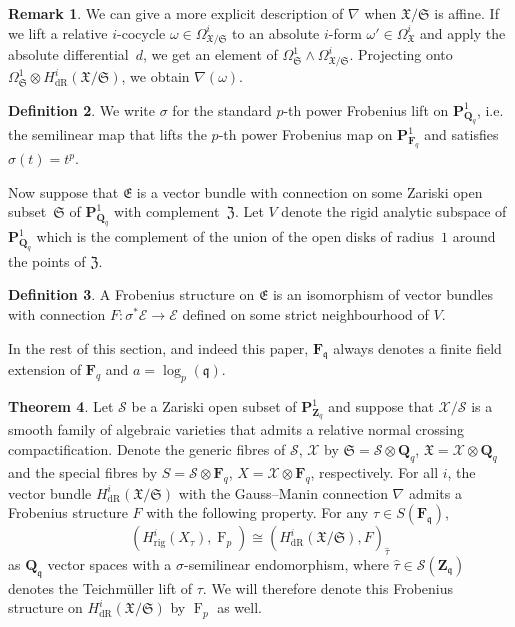 \documentclass[a4paper,11pt]{article}
\numberwithin{equation}{section}
\newcommand{\ZZ}{\mathbf{Z}} %
\newcommand{\QQ}{\mathbf{Q}} %
\newcommand{\FF}{\mathbf{F}} %
\DeclareMathOperator{\Frob}{F}           %
\providecommand{\HdR}{H_{\text{dR}}}    %
\providecommand{\Hrig}{H_{\text{rig}}}  %
\theoremstyle{definition}
\newtheorem{thm}{Theorem}[section]
\newtheorem{defn}[thm]{Definition}
\newtheorem{rem}[thm]{Remark}
\begin{document}
\begin{rem}
We can give a more explicit description of $\nabla$ when 
$\mathfrak{X}/\mathfrak{S}$ is affine. If we lift a relative $i$-cocycle 
$\omega \in \Omega^i_{\mathfrak{X}/\mathfrak{S}}$ to an absolute $i$-form 
$\omega' \in \Omega^i_{\mathfrak{X}}$ and apply the absolute differential~$d$, 
we get an element of 
$\Omega^1_{\mathfrak{S}} \wedge \Omega^i_{\mathfrak{X}/\mathfrak{S}}$. 
Projecting onto 
$\Omega^1_{\mathfrak{S}} \otimes \HdR^i(\mathfrak{X}/\mathfrak{S})$, 
we obtain $\nabla(\omega)$. 
\end{rem}

\begin{defn} \label{defn:sigma}
We write $\sigma$ for the standard $p$-th power Frobenius lift on 
$\mathbf{P}^1_{\QQ_q}$, i.e. the semilinear map that lifts the $p$-th power 
Frobenius map on $\mathbf{P}^1_{\FF_q}$ and satisfies $\sigma(t)=t^p$. 
\end{defn}

Now suppose that $\mathfrak{E}$ is a vector bundle with connection on 
some Zariski open subset~$\mathfrak{S}$ of $\mathbf{P}^1_{\QQ_q}$ with 
complement~$\mathfrak{Z}$. Let $V$ denote the rigid analytic subspace 
of $\mathbf{P}^1_{\QQ_q}$ which is the complement of the union of the 
open disks of radius~$1$ around the points of $\mathfrak{Z}$.

\begin{defn}
A Frobenius structure on $\mathfrak{E}$ is an isomorphism of vector bundles 
with connection $F \colon \sigma^* \mathcal{E} \rightarrow \mathcal{E}$ 
defined on some strict neighbourhood of $V$. 
\end{defn}

In the rest of this section, and indeed this paper, $\FF_{\mathfrak{q}}$ always
denotes a finite field extension of $\FF_q$ and $a=\log_p(\mathfrak{q})$.

\begin{thm} \label{thm:frobstruc}
Let $\mathcal{S}$ be a Zariski open subset of $\mathbf{P}^1_{\ZZ_q}$ and 
suppose that $\mathcal{X}/\mathcal{S}$ is a smooth family of algebraic 
varieties that admits a relative normal crossing compactification. Denote 
the generic fibres of $\mathcal{S}$, $\mathcal{X}$ by 
$\mathfrak{S}=\mathcal{S} \otimes \QQ_q$, $\mathfrak{X}=\mathcal{X} \otimes \QQ_q$ 
and the special fibres by $S=\mathcal{S} \otimes \FF_q$, 
$X=\mathcal{X} \otimes \FF_q$, respectively. For all $i$, the vector bundle 
$\HdR^i(\mathfrak{X}/\mathfrak{S})$ with the Gauss--Manin connection $\nabla$ 
admits a Frobenius structure $F$ with the following property. 
For any $\tau \in S(\FF_{\mathfrak{q}})$,
\[
(\Hrig^i(X_{\tau}),\Frob_p) \cong (\HdR^i(\mathfrak{X}/\mathfrak{S}),F)_{\hat{\tau}}
\] 
as $\QQ_{\mathfrak{q}}$ vector spaces with a $\sigma$-semilinear 
endomorphism, where $\hat{\tau} \in \mathcal{S}(\ZZ_{\mathfrak{q}})$ denotes 
the Teichm\"uller lift of $\tau$. We will therefore denote this Frobenius 
structure on $\HdR^i(\mathfrak{X}/\mathfrak{S})$ by $\Frob_p$ as well.
\end{thm}
\end{document}

